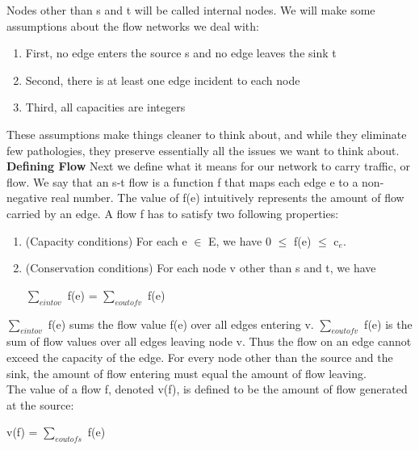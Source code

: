\documentclass{article}
\begin{document}
Nodes other than s and t will be called internal nodes. We will make some assumptions about the flow networks we deal with:\\

\begin{enumerate}
    \item First, no edge enters the source s and no edge leaves the sink t
    \item Second, there is at least one edge incident to each node
    \item Third, all capacities are integers
\end{enumerate}

These assumptions make things cleaner to think about, and while they eliminate few pathologies, they preserve essentially all the issues we want to think about.\\

\textbf{Defining Flow} Next we define what it means for our network to carry traffic, or flow. We say that an s-t flow is a function f that maps each edge e to a non-negative real number. The value of f(e) intuitively represents the amount of flow carried by an edge. A flow f has to satisfy two following properties:\\

\begin{enumerate}
    \item (Capacity conditions) For each e $\in$ E, we have 0 $\le$ f(e) $\le$ c$_e$.
    \item (Conservation conditions) For each node v other than s and t, we have\\
    \begin{center}
         $\sum_{e into v}^{}$ f(e) = $\sum_{e out of v}^{}$ f(e)
    \end{center}
\end{enumerate}

 $\sum_{e into v}^{}$ f(e) sums the flow value f(e) over all edges entering v. $\sum_{e out of v}^{}$ f(e) is the sum of flow values over all edges leaving node v. Thus the flow on an edge cannot exceed the capacity of the edge. For every node other than the source and the sink, the amount of flow entering must equal the amount of flow leaving.\\

 The value of a flow f, denoted v(f), is defined to be the amount of flow generated at the source:\\
 \begin{center}
     v(f) = $\sum_{e out of s}^{}$ f(e)
 \end{center}
\end{document}
